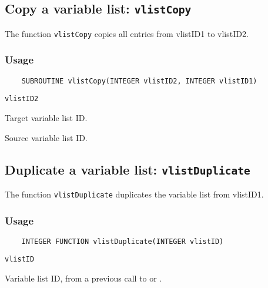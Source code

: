 \subsection{Copy a variable list: {\tt vlistCopy}}
\label{vlistCopy}

The function {\tt vlistCopy} copies all entries from vlistID1 to vlistID2.

\subsubsection*{Usage}

\begin{verbatim}
    SUBROUTINE vlistCopy(INTEGER vlistID2, INTEGER vlistID1)
\end{verbatim}

\hspace*{4mm}\begin{minipage}[]{15cm}
\begin{deflist}{\tt vlistID2\ }
\item[{\tt vlistID2}]
Target variable list ID.
\item[{\tt vlistID1}]
Source variable list ID.

\end{deflist}
\end{minipage}


\subsection{Duplicate a variable list: {\tt vlistDuplicate}}
\label{vlistDuplicate}

The function {\tt vlistDuplicate} duplicates the variable list from vlistID1.

\subsubsection*{Usage}

\begin{verbatim}
    INTEGER FUNCTION vlistDuplicate(INTEGER vlistID)
\end{verbatim}

\hspace*{4mm}\begin{minipage}[]{15cm}
\begin{deflist}{\tt vlistID\ }
\item[{\tt vlistID}]
Variable list ID, from a previous call to {} or {}.

\end{deflist}
\end{minipage}

